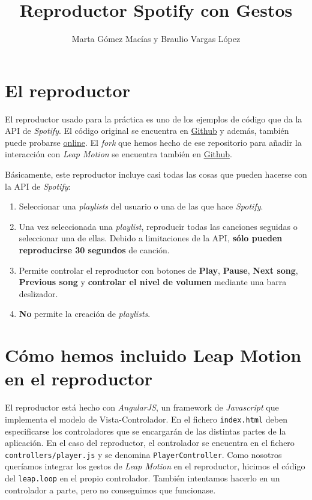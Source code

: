 \documentclass[10pt,a4paper,spanish]{article}
\title{\bf \textcolor{verde}{Reproductor Spotify con Gestos}}
\author{Marta Gómez Macías y Braulio Vargas López}
\begin{document}
\maketitle

\tableofcontents

\section{\textcolor{verde}El reproductor}
El reproductor usado para la práctica es uno de los ejemplos de código que da la API de \textit{\textcolor{verde}{Spotify}}. El código original se encuentra en \href{https://github.com/possan/webapi-player-example}{Github} y además, también puede probarse \href{http://lab.possan.se/thirtify/#/}{online}. El \textit{\textcolor{verde}{fork}} que hemos hecho de ese repositorio para añadir la interacción con \textit{\textcolor{verde}{Leap Motion}} se encuentra también en \href{https://github.com/BraulioV/webapi-player-example}{Github}.

Básicamente, este reproductor incluye casi todas las cosas que pueden hacerse con la API de \textit{\textcolor{verde}{Spotify}}:

\begin{enumerate}[\qquad \color{verde}{$\bullet$}]
  \item Seleccionar una \textit{\textcolor{verde}{playlists}} del usuario o una de las que hace \textit{\textcolor{verde}{Spotify}}.
  \item Una vez seleccionada una \textit{\textcolor{verde}{playlist}}, reproducir todas las canciones seguidas o seleccionar una de ellas. Debido a limitaciones de la API, \textcolor{verde}{\textbf{sólo pueden reproducirse 30 segundos}} de canción.
  \item Permite controlar el reproductor con botones de \textbf{\textcolor{verde}{Play}}, \textbf{\textcolor{verde}{Pause}}, \textbf{\textcolor{verde}{Next song}}, \textbf{\textcolor{verde}{Previous song}} y \textbf{\textcolor{verde}{controlar el nivel de volumen}} mediante una barra deslizador.
  \item \textbf{\textcolor{verde}{No}} permite la creación de \textit{\textcolor{verde}{playlists}}.
\end{enumerate}

\section{\textcolor{verde}Cómo hemos incluido Leap Motion en el reproductor}
El reproductor está hecho con \textit{\textcolor{verde}{AngularJS}}, un framework de \textit{\textcolor{verde}{Javascript}} que implementa el modelo de Vista-Controlador. En el fichero \texttt{index.html} deben especificarse los controladores que se encargarán de las distintas partes de la aplicación. En el caso del reproductor, el controlador se encuentra en el fichero \texttt{controllers/player.js} y se denomina \texttt{PlayerController}. Como nosotros queríamos integrar los gestos de \textit{\textcolor{verde}{Leap Motion}} en el reproductor, hicimos el código del \texttt{leap.loop} en el propio controlador. También intentamos hacerlo en un controlador a parte, pero no conseguimos que funcionase.
\end{document}
